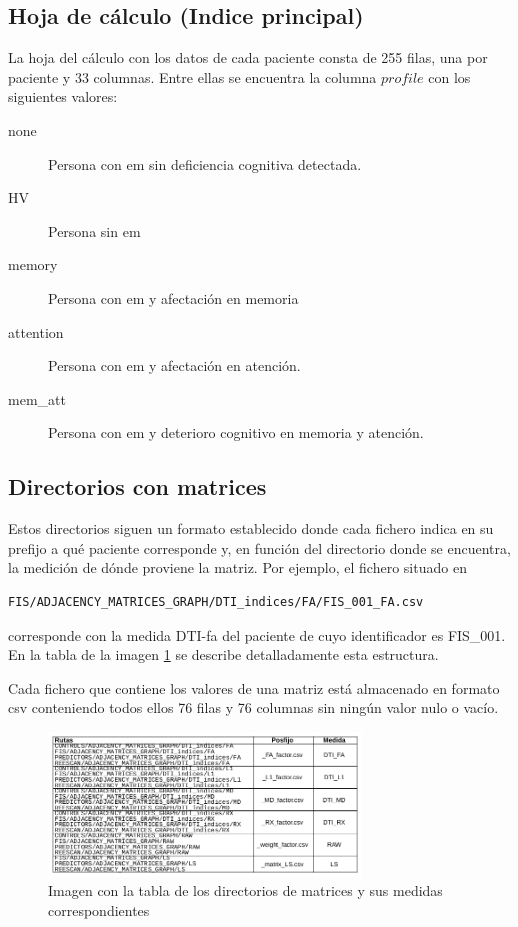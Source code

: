 \subsection{Hoja de cálculo (Indice principal)}
La hoja del cálculo con los datos de cada paciente consta de 255 filas, una por paciente
y 33 columnas. Entre ellas se encuentra la columna $profile$ con los siguientes valores:

\begin{description}
\item [none] Persona con \gls{em} sin deficiencia cognitiva detectada.
\item [HV] Persona sin \gls{em}
\item [memory] Persona con \gls{em} y afectación en memoria
\item [attention] Persona con \gls{em} y afectación en atención.
\item [mem\_att] Persona con \gls{em} y deterioro cognitivo en memoria y atención.
\end{description}

\subsection{Directorios con matrices}
Estos directorios siguen un formato establecido donde cada fichero indica en su prefijo a qué paciente corresponde y, en función del directorio donde se encuentra, la medición de dónde proviene la matriz. Por ejemplo, el fichero situado en
\begin{lstlisting}
FIS/ADJACENCY_MATRICES_GRAPH/DTI_indices/FA/FIS_001_FA.csv
\end{lstlisting}
corresponde con la medida DTI-\gls{fa} del paciente de cuyo identificador es FIS\_001. En la tabla de la imagen \ref{figure:rutas} se describe detalladamente esta estructura.

Cada fichero que contiene los valores de una matriz está almacenado en formato \gls{csv} conteniendo todos ellos 76 filas y 76 columnas sin ningún valor nulo o vacío.

\begin{figure}[H]
\centering
\includegraphics[width=0.74\textwidth]{figs/datos/rutas.png}
\caption{Imagen con la tabla de los directorios de matrices y sus medidas correspondientes}
\label{figure:rutas}
\end{figure}


